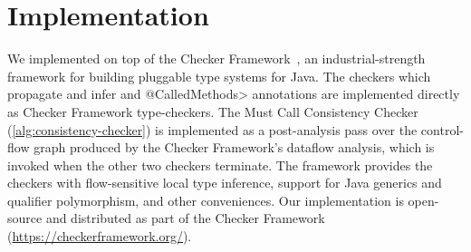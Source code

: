 \section{Implementation}
\label{sec:implementation}

We implemented \tool on top of the Checker Framework~\cite{PapiACPE2008},
an industrial-strength framework for building pluggable type systems
for Java. The checkers which propagate and infer \MustCall and
\<@CalledMethods> annotations are implemented
directly as Checker Framework type-checkers.  The Must Call Consistency
Checker (\cref{alg:consistency-checker}) is
implemented as a post-analysis pass over the control-flow graph
produced by the Checker Framework's dataflow analysis, which is invoked
when the other two checkers terminate. The framework provides the
checkers with flow-sensitive local type
inference, support for Java generics and qualifier polymorphism, and
other conveniences. Our implementation is open-source and
distributed as part of the Checker Framework (\url{https://checkerframework.org/}).

